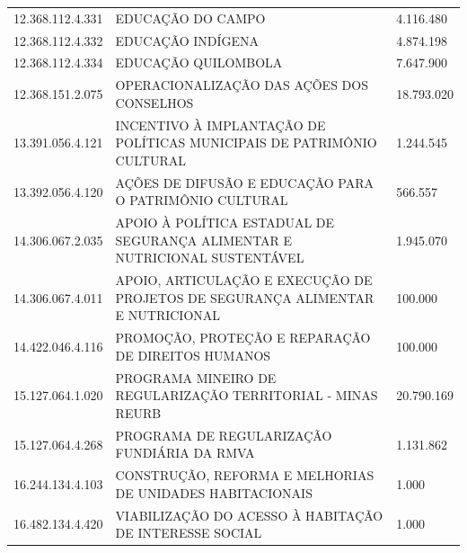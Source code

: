 \documentclass{article}
\begin{document}
\begin{longtable}[c]{m{3cm}|m{12cm}|m{2cm}}
\multicolumn{1}{C{3cm}|}{12.368.112.4.331} & \multicolumn{1}{L{12cm}|}{EDUCAÇÃO DO CAMPO} & \multicolumn{1}{R{2cm}}{4.116.480} \\
\multicolumn{1}{C{3cm}|}{12.368.112.4.332} & \multicolumn{1}{L{12cm}|}{EDUCAÇÃO INDÍGENA} & \multicolumn{1}{R{2cm}}{4.874.198} \\
\multicolumn{1}{C{3cm}|}{12.368.112.4.334} & \multicolumn{1}{L{12cm}|}{EDUCAÇÃO QUILOMBOLA} & \multicolumn{1}{R{2cm}}{7.647.900} \\
\multicolumn{1}{C{3cm}|}{12.368.151.2.075} & \multicolumn{1}{L{12cm}|}{OPERACIONALIZAÇÃO DAS AÇÕES DOS CONSELHOS} & \multicolumn{1}{R{2cm}}{18.793.020} \\
\multicolumn{1}{C{3cm}|}{13.391.056.4.121} & \multicolumn{1}{L{12cm}|}{INCENTIVO À IMPLANTAÇÃO DE POLÍTICAS MUNICIPAIS DE PATRIMÔNIO CULTURAL} & \multicolumn{1}{R{2cm}}{1.244.545} \\
\multicolumn{1}{C{3cm}|}{13.392.056.4.120} & \multicolumn{1}{L{12cm}|}{AÇÕES DE DIFUSÃO E EDUCAÇÃO PARA O PATRIMÔNIO CULTURAL} & \multicolumn{1}{R{2cm}}{566.557} \\
\multicolumn{1}{C{3cm}|}{14.306.067.2.035} & \multicolumn{1}{L{12cm}|}{APOIO À POLÍTICA ESTADUAL DE SEGURANÇA ALIMENTAR E NUTRICIONAL SUSTENTÁVEL} & \multicolumn{1}{R{2cm}}{1.945.070} \\
\multicolumn{1}{C{3cm}|}{14.306.067.4.011} & \multicolumn{1}{L{12cm}|}{APOIO, ARTICULAÇÃO E EXECUÇÃO DE PROJETOS DE SEGURANÇA ALIMENTAR E NUTRICIONAL} & \multicolumn{1}{R{2cm}}{100.000} \\
\multicolumn{1}{C{3cm}|}{14.422.046.4.116} & \multicolumn{1}{L{12cm}|}{PROMOÇÃO, PROTEÇÃO E REPARAÇÃO DE DIREITOS HUMANOS} & \multicolumn{1}{R{2cm}}{100.000} \\
\multicolumn{1}{C{3cm}|}{15.127.064.1.020} & \multicolumn{1}{L{12cm}|}{PROGRAMA MINEIRO DE REGULARIZAÇÃO TERRITORIAL - MINAS REURB} & \multicolumn{1}{R{2cm}}{20.790.169} \\
\multicolumn{1}{C{3cm}|}{15.127.064.4.268} & \multicolumn{1}{L{12cm}|}{PROGRAMA DE REGULARIZAÇÃO FUNDIÁRIA DA RMVA} & \multicolumn{1}{R{2cm}}{1.131.862} \\
\multicolumn{1}{C{3cm}|}{16.244.134.4.103} & \multicolumn{1}{L{12cm}|}{CONSTRUÇÃO, REFORMA E MELHORIAS DE UNIDADES HABITACIONAIS} & \multicolumn{1}{R{2cm}}{1.000} \\
\multicolumn{1}{C{3cm}|}{16.482.134.4.420} & \multicolumn{1}{L{12cm}|}{VIABILIZAÇÃO DO ACESSO À HABITAÇÃO DE INTERESSE SOCIAL} & \multicolumn{1}{R{2cm}}{1.000} \\

\end{longtable}
\end{document}
